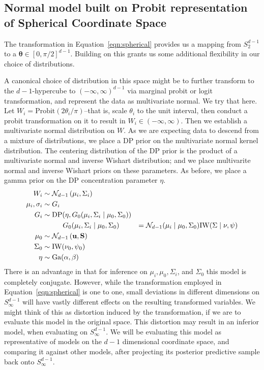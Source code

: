 
\subsection{Normal model built on Probit representation of Spherical Coordinate Space}
\label{method:npprobitnorm}
The transformation in Equation~\ref{eqn:spherical} provides us a mapping from $S_{2}^{d-1}$ to a
  $\bm{\theta} \in [0, \pi/2]^{d-1}$.  Building on this grants us some additional flexibility in our
  choice of distributions.

A canonical choice of distribution in this space might be to further transform to the $d-1$-hypercube
  to $(-\infty, \infty)^{d-1}$ via marginal probit or logit transformation, and represent the data as
  multivariate normal.  We try that here.  Let $W_i = \text{Probit}(2\theta_i /\pi)$--that is,
  scale $\theta_i$ to the unit interval, then conduct a probit transformation on it to result in
  $W_i \in (-\infty, \infty)$.  Then we establish a multivariate normal distribution on $W$. As we
  are expecting data to descend from a mixture of distributions, we place a DP prior on the multivariate
  normal kernel distribution.  The centering distribution of the DP prior is the product of a
  multivariate normal and inverse Wishart distribution; and we place multivarite normal and inverse
  Wishart priors on these parameters.  As before, we place a gamma prior on the DP concentration
  parameter $\eta$.
  \begin{equation}
    \begin{aligned}
                W_i &\sim \mathcal{N}_{d-1}\left(\mu_i, \Sigma_i\right)\\
    \mu_i, \sigma_i &\sim G_i\\
                G_i &\sim \text{DP}(\eta, G_0(\mu_i,\Sigma_i\mid\mu_0,\Sigma_0))\\
                    &\hspace{1cm}G_0(\mu_i,\Sigma_i\mid\mu_0,\Sigma_0) &=
                      \mathcal{N}_{d-1}(\mu_i\mid\mu_0,\Sigma_0)\text{IW}(\Sigma\mid\nu,\psi)\\
              \mu_0 &\sim \mathcal{N}_{d-1}\left({\bf u},{\bf S}\right)\\
           \Sigma_0 &\sim \text{IW}(\nu_0,\psi_0)\\
               \eta &\sim \text{Ga}(\alpha, \beta)
    \end{aligned}
  \end{equation}
  There is an advantage in that for inference on $\mu_i, \mu_0, \Sigma_i$, and $\Sigma_0$ this model
  is completely conjugate.  However, while the transformation employed in Equation~\ref{eqn:spherical}
  is one to one, small deviations in different dimensions on $S_{\infty}^{d-1}$ will have vastly
  different effects on the resulting transformed variables.  We might think of this as distortion
  induced by the transformation, if we are to evaluate this model in the original space.  This
  distortion may result in an inferior model, when evaluating on $S_{\infty}^{d-1}$.  We will be
  evaluating this model as representative of models on the $d-1$ dimensional coordinate space, and
  comparing it against other models, after projecting its posterior predictive sample back onto
  $S_{\infty}^{d-1}$.

